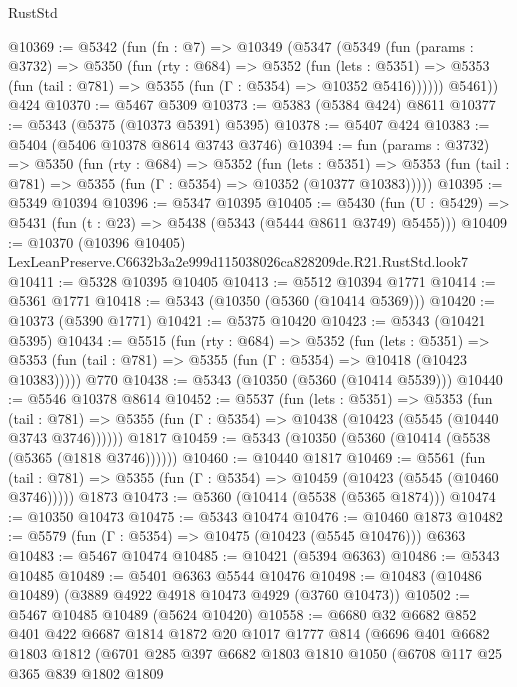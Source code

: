 \begin{lexlean}{RustStd}
\begin{coremodule}
@10369 := @5342
    (fun (fn : @7) =>
    @10349
      (@5347
        (@5349
          (fun (params : @3732) =>
          @5350
            (fun (rty : @684) =>
            @5352
              (fun (lets : @5351) =>
              @5353 (fun (tail : @781) => @5355 (fun (Γ : @5354) => @10352 @5416))))))
        @5461))
    @424
@10370 := @5467 @5309
@10373 := @5383 (@5384 @424) @8611
@10377 := @5343 (@5375 (@10373 @5391) @5395)
@10378 := @5407 @424
@10383 := @5404 (@5406 @10378 @8614 @3743 @3746)
@10394 := fun (params : @3732) =>
  @5350
    (fun (rty : @684) =>
    @5352
      (fun (lets : @5351) =>
      @5353 (fun (tail : @781) => @5355 (fun (Γ : @5354) => @10352 (@10377 @10383)))))
@10395 := @5349 @10394
@10396 := @5347 @10395
@10405 := @5430
    (fun (U : @5429) => @5431 (fun (t : @23) => @5438 (@5343 (@5444 @8611 @3749) @5455)))
@10409 := @10370 (@10396 @10405) LexLeanPreserve.C6632b3a2e999d115038026ca828209de.R21.RustStd.look7
@10411 := @5328 @10395 @10405
@10413 := @5512 @10394 @1771
@10414 := @5361 @1771
@10418 := @5343 (@10350 (@5360 (@10414 @5369)))
@10420 := @10373 (@5390 @1771)
@10421 := @5375 @10420
@10423 := @5343 (@10421 @5395)
@10434 := @5515
    (fun (rty : @684) =>
    @5352
      (fun (lets : @5351) =>
      @5353 (fun (tail : @781) => @5355 (fun (Γ : @5354) => @10418 (@10423 @10383)))))
    @770
@10438 := @5343 (@10350 (@5360 (@10414 @5539)))
@10440 := @5546 @10378 @8614
@10452 := @5537
    (fun (lets : @5351) =>
    @5353
      (fun (tail : @781) =>
      @5355 (fun (Γ : @5354) => @10438 (@10423 (@5545 (@10440 @3743 @3746))))))
    @1817
@10459 := @5343 (@10350 (@5360 (@10414 (@5538 (@5365 (@1818 @3746))))))
@10460 := @10440 @1817
@10469 := @5561
    (fun (tail : @781) => @5355 (fun (Γ : @5354) => @10459 (@10423 (@5545 (@10460 @3746)))))
    @1873
@10473 := @5360 (@10414 (@5538 (@5365 @1874)))
@10474 := @10350 @10473
@10475 := @5343 @10474
@10476 := @10460 @1873
@10482 := @5579 (fun (Γ : @5354) => @10475 (@10423 (@5545 @10476))) @6363
@10483 := @5467 @10474
@10485 := @10421 (@5394 @6363)
@10486 := @5343 @10485
@10489 := @5401 @6363 @5544 @10476
@10498 := @10483 (@10486 @10489) (@3889 @4922 @4918 @10473 @4929 (@3760 @10473))
@10502 := @5467 @10485 @10489 (@5624 @10420)
@10558 := @6680
    @32
    @6682
    @852
    @401
    @422
    @6687
    @1814
    @1872
    @20
    @1017
    @1777
    @814
    (@6696
      @401
      @6682
      @1803
      @1812
      (@6701
        @285
        @397
        @6682
        @1803
        @1810
        @1050
        (@6708
          @117
          @25
          @365
          @839
          @1802
          @1809

\end{coremodule}
\end{lexlean}
